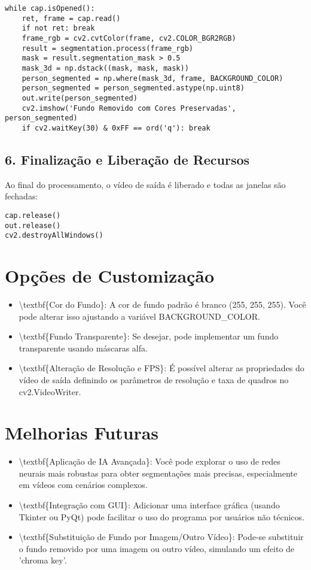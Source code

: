 \documentclass{article}%
\begin{document}
\begin{verbatim}
while cap.isOpened():
    ret, frame = cap.read()
    if not ret: break
    frame_rgb = cv2.cvtColor(frame, cv2.COLOR_BGR2RGB)
    result = segmentation.process(frame_rgb)
    mask = result.segmentation_mask > 0.5
    mask_3d = np.dstack((mask, mask, mask))
    person_segmented = np.where(mask_3d, frame, BACKGROUND_COLOR)
    person_segmented = person_segmented.astype(np.uint8)
    out.write(person_segmented)
    cv2.imshow('Fundo Removido com Cores Preservadas', person_segmented)
    if cv2.waitKey(30) & 0xFF == ord('q'): break
\end{verbatim}

%
\subsection{6. Finalização e Liberação de Recursos}%
\label{subsec:6.FinalizaoeLiberaodeRecursos}%
Ao final do processamento, o vídeo de saída é liberado e todas as janelas são fechadas:%

\begin{verbatim}
cap.release()
out.release()
cv2.destroyAllWindows()
\end{verbatim}

%
\section{Opções de Customização}%
\label{sec:OpesdeCustomizao}%
\begin{itemize}%
\item%
\textbackslash{}textbf\{Cor do Fundo\}: A cor de fundo padrão é branco (255, 255, 255). Você pode alterar isso ajustando a variável BACKGROUND\_COLOR.%
\item%
\textbackslash{}textbf\{Fundo Transparente\}: Se desejar, pode implementar um fundo transparente usando máscaras alfa.%
\item%
\textbackslash{}textbf\{Alteração de Resolução e FPS\}: É possível alterar as propriedades do vídeo de saída definindo os parâmetros de resolução e taxa de quadros no cv2.VideoWriter.%
\end{itemize}

%
\section{Melhorias Futuras}%
\label{sec:MelhoriasFuturas}%
\begin{itemize}%
\item%
\textbackslash{}textbf\{Aplicação de IA Avançada\}: Você pode explorar o uso de redes neurais mais robustas para obter segmentações mais precisas, especialmente em vídeos com cenários complexos.%
\item%
\textbackslash{}textbf\{Integração com GUI\}: Adicionar uma interface gráfica (usando Tkinter ou PyQt) pode facilitar o uso do programa por usuários não técnicos.%
\item%
\textbackslash{}textbf\{Substituição de Fundo por Imagem/Outro Vídeo\}: Pode{-}se substituir o fundo removido por uma imagem ou outro vídeo, simulando um efeito de 'chroma key'.%
\end{itemize}
\end{document}
